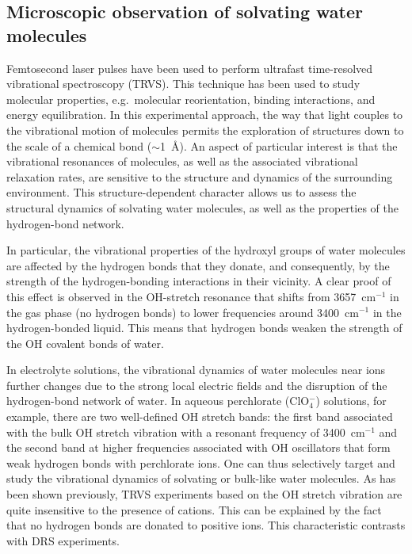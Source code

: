 \subsection{Microscopic observation of solvating water molecules}



Femtosecond laser pulses have been used to perform ultrafast time-resolved vibrational spectroscopy (TRVS). This technique has been used to study molecular properties, e.g.\ molecular reorientation,\!\cite{Loparo2004,Rezus2005,Rezus2006,Thogersen2008,Shattuck2016} binding interactions,\!\cite{Eaves2005,Fecko2005,Baiz2015,Stevenson2015,Zhang2016} and energy equilibration.\!\cite{Woutersen1999,Piatkowski2009,Timmer2010} In this experimental approach, the way that light couples to the vibrational motion of molecules permits the exploration of structures down to the scale of a chemical bond ($\sim$1~\AA). An aspect of particular interest is that the vibrational resonances of molecules, as well as the associated vibrational relaxation rates, are sensitive to the structure and dynamics of the surrounding environment. This structure-dependent character allows us to assess the structural dynamics of solvating water molecules, as well as the properties of the hydrogen-bond network.



In particular, the vibrational properties of the hydroxyl groups of water molecules are affected by the hydrogen bonds that they donate, and consequently, by the strength of the hydrogen-bonding interactions in their vicinity.\!\cite{Lawrence2003,Auer2009,Bakker2010} A clear proof of this effect is observed in the OH-stretch resonance that shifts from 3657~cm$^{-1}$ in the gas phase (no hydrogen bonds) to lower frequencies around 3400~cm$^{-1}$ in the hydrogen-bonded liquid. This means that hydrogen bonds weaken the strength of the OH covalent bonds of water.



In electrolyte solutions, the vibrational dynamics of water molecules near ions further changes due to the strong local electric fields and the disruption of the hydrogen-bond network of water. In aqueous perchlorate (ClO$_4^{-}$) solutions, for example, there are two well-defined OH stretch bands: the first band associated with the bulk OH stretch vibration with a resonant frequency of 3400~cm$^{-1}$ and the second band at higher frequencies associated with OH oscillators that form weak hydrogen bonds with perchlorate ions.\!\cite{Timmer2010} One can thus selectively target and study the vibrational dynamics of solvating or bulk-like water molecules. As has been shown previously, TRVS experiments based on the OH stretch vibration are quite insensitive to the presence of cations.\!\cite{Omta2003,Omta2003a} This can be explained by the fact that no hydrogen bonds are donated to positive ions. This characteristic contrasts with DRS experiments.



